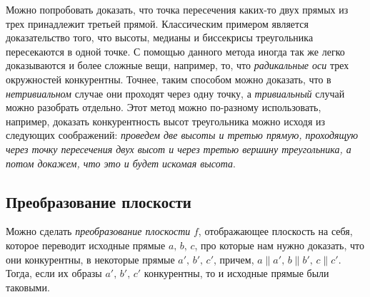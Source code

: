 \documentclass[14pt]{extarticle}
\theoremstyle{definition}
\theoremstyle{theorem}
\begin{document}
\begin{figure}

\vspace{0cm}
\vspace{-1cm}
\end{figure}

Можно попробовать доказать, что точка пересечения каких-то двух прямых из трех
принадлежит третьей прямой. Классическим примером является доказательство
того, что высоты, медианы и биссекрисы треугольника пересекаются в одной точке.
С помощью данного метода иногда так же легко доказываются и более сложные вещи,
например, то, что \textit{радикальные оси} трех окружностей конкурентны. 
Точнее, таким способом можно доказать, что в \textit{нетривиальном} случае они 
проходят через одну точку, а \textit{тривиальный} случай можно разобрать
отдельно. Этот метод можно по-разному использовать, например, доказать
конкурентность высот треугольника можно исходя из следующих соображений: 
\textit{проведем две высоты и третью прямую, проходящую через точку пересечения
двух высот и через третью вершину треугольника, а потом докажем, что это и будет
искомая высота}.




\subsection{Преобразование плоскости}
Можно сделать \textit{преобразование плоскости} $f$, отображающее плоскость на себя,
которое переводит исходные прямые \(a, \, b, \, c\), про которые нам нужно доказать,
что они конкурентны, в некоторые прямые \(a', \, b', \, c'\), причем,
\(a \parallel a', \, b \parallel b', \, c \parallel c'\).
Тогда, если их образы \(a', \, b', \, c'\) конкурентны, то и исходные
прямые были таковыми.
\end{document}
